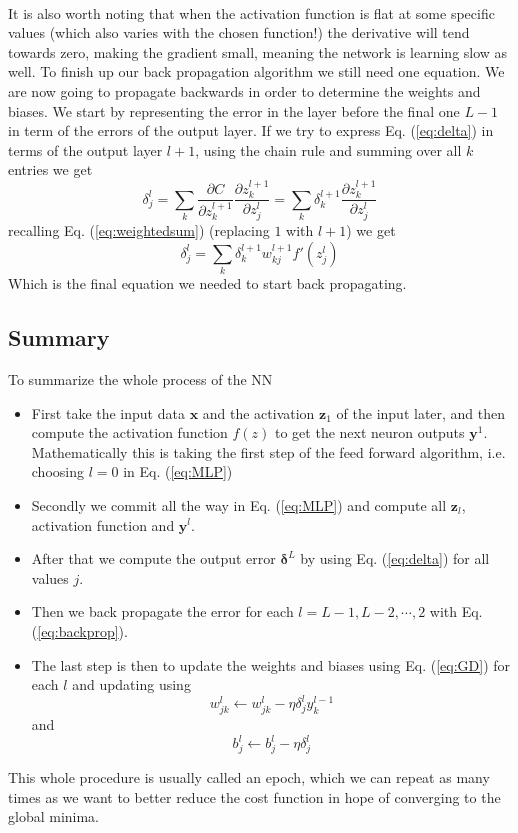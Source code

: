 \documentclass[14pt, a4paper]{book}
\begin{document}
\\It is also worth noting that when the activation function is flat at some specific values (which also varies with the chosen function!) the derivative will tend towards zero, making the gradient small, 
meaning the network is learning slow as well. To finish up our back propagation algorithm we still need one equation. We are now going to propagate backwards in order to determine the weights and biases. 
We start by representing the error in the layer before the final one $L-1$ in term of the errors of the output layer. If we try to express Eq. (\ref{eq:delta}) in terms of the output layer $l+1$, 
using the chain rule and summing over all $k$ entries we get
$$
\delta_j^l=\sum_k\frac{\partial C}{\partial z_k^{l+1}}\frac{\partial z_k^{l+1}}{\partial z_j^l} =\sum_k \delta_k^{l+1}\frac{\partial z_k^{l+1}}{\partial z_j^l}
$$
recalling Eq. (\ref{eq:weightedsum}) (replacing $1$ with $l+1$) we get
\begin{equation}\label{eq:backprop}
    \delta_j^l=\sum_k\delta_k^{l+1}w_{kj}^{l+1}f'(z_j^l)
\end{equation}
Which is the final equation we needed to start back propagating. 

\subsection{Summary}
To summarize the whole process of the NN
\begin{itemize}
    \item First take the input data $\mathbf{x}$ and the activation $\mathbf{z}_1$ of the input later, and then compute the activation function $f(z)$ to get the next neuron outputs $\mathbf{y}^1$. 
    Mathematically this is taking the first step of the feed forward algorithm, i.e. choosing $l=0$ in Eq. (\ref{eq:MLP})
    \item Secondly we commit all the way in Eq. (\ref{eq:MLP}) and compute all $\mathbf{z}_l$, activation function and $\mathbf{y}^l$.
    \item After that we compute the output error $\bm{\delta}^L$ by using Eq. (\ref{eq:delta}) for all values $j$.
    \item Then we back propagate the error for each $l=L-1,L-2,\cdots,2$ with Eq. (\ref{eq:backprop}).
    \item The last step is then to update the weights and biases using Eq. (\ref{eq:GD}) for each $l$ and updating using
    $$
    w_{jk}^l\leftarrow w_{jk}^l-\eta\delta_j^ly_k^{l-1}
    $$
    and
    $$
    b_j^l \leftarrow b_j^l-\eta\delta_j^l
    $$
\end{itemize}
This whole procedure is usually called an epoch, which we can repeat as many times as we want to better reduce the cost function in hope of converging to the global minima.
\end{document}
